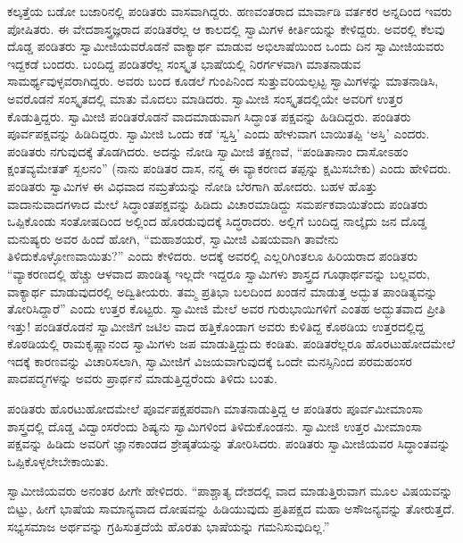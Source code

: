  ಕಲ್ಕತ್ತೆಯ ಬಡೋ ಬಜಾರಿನಲ್ಲಿ ಪಂಡಿತರು ವಾಸವಾಗಿದ್ದರು. ಹಣವಂತರಾದ ಮಾರ್ವಾಡಿ ವರ್ತಕರ ಅನ್ನದಿಂದ ಇವರು ಪೋಷಿತರು. ಈ ವೇದಶಾಸ್ತ್ರಜ್ಞರಾದ ಪಂಡಿತರೆಲ್ಲ ಆ ಕಾಲದಲ್ಲಿ ಸ್ವಾಮಿಗಳ ಕೀರ್ತಿಯನ್ನು ಕೇಳಿದ್ದರು. ಅವರಲ್ಲಿ ಕೆಲವು ದೊಡ್ಡ ಪಂಡಿತರು ಸ್ವಾಮೀಜಿಯವರೊಡನೆ ವಾಕ್ಯಾರ್ಥ ಮಾಡುವ ಅಭಿಲಾಷೆಯಿಂದ ಒಂದು ದಿನ ಸ್ವಾಮೀಜಿಯವರು ಇದ್ದಕಡೆ ಬಂದರು. ಬಂದಿದ್ದ ಪಂಡಿತರೆಲ್ಲ ಸಂಸ್ಕೃತ ಭಾಷೆಯಲ್ಲಿ ನಿರರ್ಗಳವಾಗಿ ಮಾತನಾಡುವ ಸಾಮರ್ಥ್ಯವುಳ್ಳವರಾಗಿದ್ದರು. ಅವರು ಬಂದ ಕೂಡಲೆ ಗುಂಪಿನಿಂದ ಸುತ್ತುವರಿಯಲ್ಪಟ್ಟ ಸ್ವಾಮಿಗಳನ್ನು ಮಾತನಾಡಿಸಿ, ಅವರೊಡನೆ ಸಂಸ್ಕೃತದಲ್ಲಿ ಮಾತು ಮೊದಲು ಮಾಡಿದರು. ಸ್ವಾಮೀಜಿ ಸಂಸ್ಕೃತದಲ್ಲಿಯೇ ಅವರಿಗೆ ಉತ್ತರ ಕೊಡುತ್ತಿದ್ದರು. ಸ್ವಾಮೀಜಿ ಪಂಡಿತರೊಡನೆ ವಾದಮಾಡುವಾಗ ಸಿದ್ಧಾಂತ ಪಕ್ಷವನ್ನು ಹಿಡಿದಿದ್ದರು. ಪಂಡಿತರು ಪೂರ್ವಪಕ್ಷವನ್ನು ಹಿಡಿದಿದ್ದರು. ಸ್ವಾಮೀಜಿ ಒಂದು ಕಡೆ ‘ಸ್ವಸ್ತಿ’ ಎಂದು ಹೇಳುವಾಗ ಬಾಯಿತಪ್ಪಿ ‘ಅಸ್ತಿ’ ಎಂದರು. ಪಂಡಿತರು ನಗುವುದಕ್ಕೆ ತೊಡಗಿದರು. ಅದನ್ನು ನೋಡಿ ಸ್ವಾಮೀಜಿ ತಕ್ಷಣವೆ, “ಪಂಡಿತಾನಾಂ ದಾಸೋಽಹಂ ಕ್ಷಂತವ್ಯಮೇತತ್ ಸ್ಖಲನಂ” (ನಾನು ಪಂಡಿತರ ದಾಸ, ನನ್ನ ಈ ವ್ಯಾಕರಣದ ತಪ್ಪನ್ನು ಕ್ಷಮಿಸಬೇಕು) ಎಂದು ಹೇಳಿದರು. ಪಂಡಿತರು ಸ್ವಾಮಿಗಳ ಈ ವಿಧವಾದ ನಮ್ರತೆಯನ್ನು ನೋಡಿ ಬೆರಗಾಗಿ ಹೋದರು. ಬಹಳ ಹೊತ್ತು ವಾದಾನುವಾದಗಳಾದ ಮೇಲೆ ಸಿದ್ಧಾಂತಪಕ್ಷವನ್ನು ಹಿಡಿದು ವಿಚಾರಮಾಡಿದ್ದು ಸಮರ್ಪಕವಾಯಿತೆಂದು ಪಂಡಿತರು ಒಪ್ಪಿಕೊಂಡು ಸಂತೋಷದಿಂದ ಅಲ್ಲಿಂದ ಹೊರಡುವುದಕ್ಕೆ ಸಿದ್ಧರಾದರು. ಅಲ್ಲಿಗೆ ಬಂದಿದ್ದ ನಾಲ್ಕೈದು ಜನ ದೊಡ್ಡ ಮನುಷ್ಯರು ಅವರ ಹಿಂದೆ ಹೋಗಿ, “ಮಹಾಶಯರೆ, ಸ್ವಾಮೀಜಿ ವಿಷಯವಾಗಿ ತಾವೇನು ತಿಳಿದುಕೊಳ್ಳೋಣವಾಯಿತು?” ಎಂದು ಕೇಳಿದರು. ಅದಕ್ಕೆ ಅವರಲ್ಲಿ ಎಲ್ಲರಿಗಿಂತಲೂ ಹಿರಿಯರಾದ ಪಂಡಿತರು “ವ್ಯಾಕರಣದಲ್ಲಿ ಹೆಚ್ಚು ಆಳವಾದ ಪಾಂಡಿತ್ಯ ಇಲ್ಲದೇ ಇದ್ದರೂ ಸ್ವಾಮಿಗಳು ಶಾಸ್ತ್ರದ ಗೂಢಾರ್ಥವನ್ನು ಬಲ್ಲವರು, ವಾಕ್ಯಾರ್ಥ ಮಾಡುವುದರಲ್ಲಿ ಅದ್ವಿತೀಯರು. ತಮ್ಮ ಪ್ರತಿಭಾ ಬಲದಿಂದ ಖಂಡನೆ ಮಾಡುತ್ತ ಅದ್ಭುತ ಪಾಂಡಿತ್ಯವನ್ನು ತೋರಿಸಿದ್ದಾರೆ” ಎಂದು ಉತ್ತರ ಕೊಟ್ಟರು. ಸ್ವಾಮೀಜಿ ಮೇಲೆ ಅವರ ಗುರುಭಾಯಿಗಳಿಗೆ ಎಂತಹ ಅದ್ಭುತವಾದ ಪ್ರೀತಿ ಇತ್ತು! ಪಂಡಿತರೊಡನೆ ಸ್ವಾಮೀಜಿಗೆ ಜಟಿಲ ವಾದ ಹತ್ತಿಕೊಂಡಾಗ ಅವರು ಕುಳಿತಿದ್ದ ಕೊಠಡಿಯ ಉತ್ತರದಲ್ಲಿದ್ದ ಕೊಠಡಿಯಲ್ಲಿ ರಾಮಕೃಷ್ಣಾನಂದ ಸ್ವಾಮಿಗಳು ಜಪ ಮಾಡುತ್ತಿದ್ದುದು ಕಂಡಿತು. ಪಂಡಿತರೆಲ್ಲರೂ ಹೊರಟುಹೋದಮೇಲೆ ಇದಕ್ಕೆ ಕಾರಣವನ್ನು ವಿಚಾರಿಸಲಾಗಿ, ಸ್ವಾಮೀಜಿಗೆ ವಿಜಯವಾಗುವುದಕ್ಕೆ ಒಂದೇ ಮನಸ್ಸಿನಿಂದ ಪರಮಹಂಸರ ಪಾದಪದ್ಮಗಳನ್ನು ಅವರು ಪ್ರಾರ್ಥನೆ ಮಾಡುತ್ತಿದ್ದರೆಂದು ತಿಳಿದು ಬಂತು. 

 ಪಂಡಿತರು ಹೊರಟುಹೋದಮೇಲೆ ಪೂರ್ವಪಕ್ಷಪರವಾಗಿ ಮಾತನಾಡುತ್ತಿದ್ದ ಆ ಪಂಡಿತರು ಪೂರ್ವಮೀಮಾಂಸಾ ಶಾಸ್ತ್ರದಲ್ಲಿ ದೊಡ್ಡ ವಿದ್ವಾಂಸರೆಂದು ಶಿಷ್ಯನು ಸ್ವಾಮಿಗಳಿಂದ ತಿಳಿದುಕೊಂಡನು. ಸ್ವಾಮೀಜಿ ಉತ್ತರ ಮೀಮಾಂಸಾ ಪಕ್ಷವನ್ನು ಹಿಡಿದು ಅವರಿಗೆ ಜ್ಞಾನಕಾಂಡದ ಶ್ರೇಷ್ಠತೆಯನ್ನು ತೋರಿಸಿದರು. ಪಂಡಿತರು ಸ್ವಾಮೀಜಿಯವರ ಸಿದ್ಧಾಂತವನ್ನು ಒಪ್ಪಿಕೊಳ್ಳಲೇಬೇಕಾಯಿತು. 

 ಸ್ವಾಮೀಜಿಯವರು ಅನಂತರ ಹೀಗೇ ಹೇಳಿದರು. “ಪಾಶ್ಚಾತ್ಯ ದೇಶದಲ್ಲಿ ವಾದ ಮಾಡುತ್ತಿರುವಾಗ ಮೂಲ ವಿಷಯವನ್ನು ಬಿಟ್ಟು, ಹೀಗೆ ಭಾಷೆಯ ಸಾಮಾನ್ಯವಾದ ದೋಷವನ್ನು ಹಿಡಿಯುವುದು ಪ್ರತಿಪಕ್ಷದ ಮಹಾ ಅಸೌಜನ್ಯವನ್ನು ತೋರುತ್ತದೆ. ಸಭ್ಯಸಮಾಜ ಅರ್ಥವನ್ನು ಗ್ರಹಿಸುತ್ತದೆಯೆ ಹೊರತು ಭಾಷೆಯನ್ನು ಗಮನಿಸುವುದಿಲ್ಲ.” 

